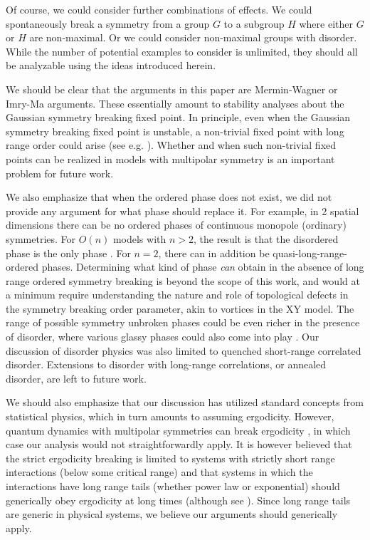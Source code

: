 \documentclass[twocolumn, longbibliography]{revtex4-2}
\begin{document}
Of course, we could consider further combinations of effects. We could spontaneously break a symmetry from a group $G$ to a subgroup $H$ where either $G$ or $H$ are non-maximal. Or we could consider non-maximal groups with disorder. While the number of potential examples to consider is unlimited, they should all be analyzable using the ideas introduced herein. 

We should be clear that the arguments in this paper are Mermin-Wagner or Imry-Ma arguments. These essentially amount to stability analyses about the Gaussian symmetry breaking fixed point. In principle, even when the Gaussian symmetry breaking fixed point is unstable, a non-trivial fixed point with long range order could arise (see e.g. \cite{TonerRadzihovsky}). Whether and when such non-trivial fixed points can be realized in models with multipolar symmetry is an important problem for future work. 

We also emphasize that when the ordered phase does not exist, we did not provide any argument for what phase should replace it. For example, in 2 spatial dimensions there can be no ordered phases of continuous monopole (ordinary) symmetries. For $O(n)$ models with $n>2$, the result is that the disordered phase is the only phase \cite{polyakov}. For $n=2$, there can in addition be quasi-long-range-ordered phases. Determining what kind of phase {\it can} obtain in the absence of long range ordered symmetry breaking is beyond the scope of this work, and would at a minimum require understanding the nature and role of topological defects in the symmetry breaking order parameter, akin to vortices in the XY model. The range of possible symmetry unbroken phases could be even richer in the presence of disorder, where various glassy phases could also come into play \cite{Fisheretal}. Our discussion of disorder physics was also limited to quenched short-range correlated disorder. Extensions to disorder with long-range correlations, or annealed disorder, are left to future work.

We should also emphasize that our discussion has utilized standard concepts from statistical physics, which in turn amounts to assuming  ergodicity. However, quantum dynamics with multipolar symmetries can break ergodicity \cite{KHN, Sala}, in which case our analysis would not straightforwardly apply. It is however believed that the strict ergodicity breaking is limited to systems with strictly short range interactions (below some critical range) and that systems in which the interactions have long range tails (whether power law or exponential) should generically obey ergodicity at long times (although see \cite{NS}). Since long range tails are generic in physical systems, we believe our arguments should generically apply.  
\end{document}
